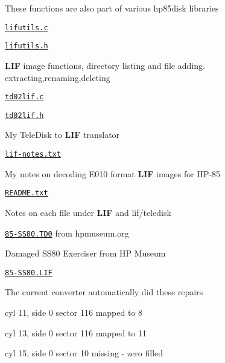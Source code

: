 \begin{DoxyItemize}
\begin{DoxyItemize}
\begin{DoxyItemize}
\begin{DoxyItemize}
\begin{DoxyItemize}
\item These functions are also part of various hp85disk libraries
\end{DoxyItemize}
\end{DoxyItemize}
\item \href{lif/lifutils.c}{\tt lifutils.\+c}
\item \href{lif/lifutils.h}{\tt lifutils.\+h}
\begin{DoxyItemize}
\item {\bfseries L\+IF} image functions, directory listing and file adding. extracting,renaming,deleting
\end{DoxyItemize}
\item \href{lif/td02lif.c}{\tt td02lif.\+c}
\item \href{lif/td02lif.h}{\tt td02lif.\+h}
\begin{DoxyItemize}
\item My Tele\+Disk to {\bfseries L\+IF} translator
\end{DoxyItemize}
\item \href{lif/lif-notes.txt}{\tt lif-\/notes.\+txt}
\begin{DoxyItemize}
\item My notes on decoding E010 format {\bfseries L\+IF} images for H\+P-\/85
\end{DoxyItemize}
\item \href{lif/README.txt}{\tt R\+E\+A\+D\+M\+E.\+txt}
\begin{DoxyItemize}
\item Notes on each file under {\bfseries L\+IF} and lif/teledisk
\end{DoxyItemize}
\item \href{lif/85-SS80.TD0}{\tt 85-\/\+S\+S80.\+T\+D0} from hpmuseum.\+org
\begin{DoxyItemize}
\item Damaged S\+S80 Exerciser from HP Museum
\end{DoxyItemize}
\item \href{lif/85-SS80.LIF}{\tt 85-\/\+S\+S80.\+L\+IF}
\begin{DoxyItemize}
\item The current converter automatically did these repairs
\begin{DoxyItemize}
\item cyl 11, side 0 sector 116 mapped to 8
\item cyl 13, side 0 sector 116 mapped to 11
\item cyl 15, side 0 sector 10 missing -\/ zero filled
\end{DoxyItemize}
\end{DoxyItemize}
\end{DoxyItemize}
\end{DoxyItemize}
\end{DoxyItemize}

